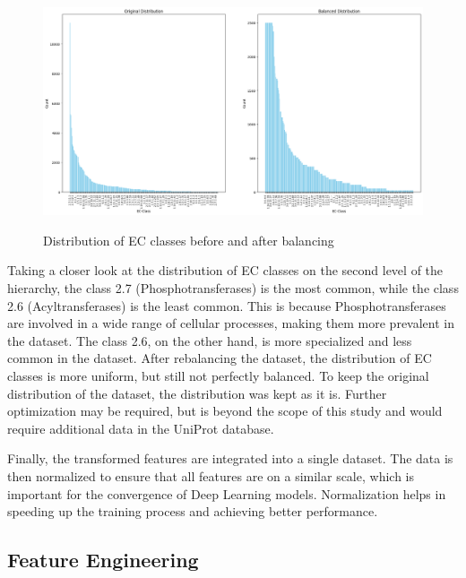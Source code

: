 \begin{figure}[!htbp]
    \centering
    \begin{minipage}[t]{\textwidth}
    \caption{Distribution of EC classes before and after balancing}
    \includegraphics[width=1\textwidth]{img/ec-distribution-comparison.png}
    \label{fig:ec-distribution-comparison}
    \end{minipage}
\end{figure}

Taking a closer look at the distribution of EC classes on the second level of the hierarchy, the class 2.7 (Phosphotransferases) is the most common, while the class 2.6 (Acyltransferases) is the least common. This is because Phosphotransferases are involved in a wide range of cellular processes, making them more prevalent in the dataset. The class 2.6, on the other hand, is more specialized and less common in the dataset. After rebalancing the dataset, the distribution of EC classes is more uniform, but still not perfectly balanced. To keep the original distribution of the dataset, the distribution was kept as it is. Further optimization may be required, but is beyond the scope of this study and would require additional data in the UniProt database.

Finally, the transformed features are integrated into a single dataset. The data is then normalized to ensure that all features are on a similar scale, which is important for the convergence of Deep Learning models. Normalization helps in speeding up the training process and achieving better performance. \autocite{ioffeBatchNormalizationAccelerating2015}

\subsection{Feature Engineering}
\label{sec:Feature Engineering}

